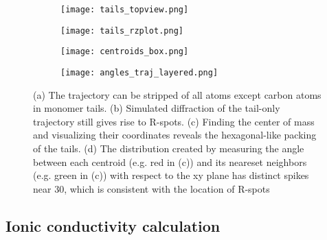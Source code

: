 \begin{figure}[ht]
	\centering
	\begin{subfigure}{0.45\textwidth}
		\centering
		\hspace{-1cm}
		\vspace{1cm}
		\texttt{[image: tails\_topview.png]}
		\caption{}\label{fig:tails_topview}
	\end{subfigure}
	\begin{subfigure}{0.45\textwidth}
		\centering
		\texttt{[image: tails\_rzplot.png]}
		\caption{}\label{fig:tails_rzplot}
	\end{subfigure}
	\begin{subfigure}{0.45\textwidth}
		\centering
		\texttt{[image: centroids\_box.png]}
		\caption{}\label{fig:centroids}
	\end{subfigure}
	\begin{subfigure}{0.45\textwidth}
		\centering
		\texttt{[image: angles\_traj\_layered.png]}
		\caption{}\label{fig:angle_distribution}
	\end{subfigure}
	\caption{(a) The trajectory can be stripped of all atoms except carbon
	atoms in monomer tails. (b) Simulated diffraction of the tail-only trajectory
	still gives rise to R-spots. (c) Finding the center of mass and visualizing 
	their coordinates reveals the hexagonal-like packing of the tails. (d) The 
	distribution created by measuring the angle between each centroid (e.g. red 
	in (c)) and its neareset neighbors (e.g. green in (c)) with respect to the xy
	plane has distinct spikes near 30\degree, which is consistent with the location
	of R-spots}\label{fig:tail_packing}
\end{figure}

\subsection*{Ionic conductivity calculation}

